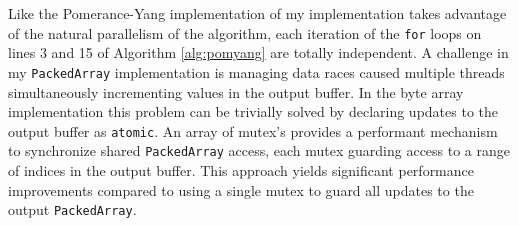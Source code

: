 \documentclass{article}
\theoremstyle{definition}
\begin{document}
Like the Pomerance-Yang implementation of \cite{chum_guy_jacobson_mosunov_2018} my implementation takes advantage of the natural parallelism of the algorithm, each iteration of the \texttt{for} loops on lines 3 and 15 of Algorithm \ref{alg:pomyang} are totally independent. A challenge in my \texttt{PackedArray} implementation is managing data races caused multiple threads simultaneously incrementing values in the output buffer. In the byte array implementation this problem can be trivially solved by declaring updates to the output buffer as \texttt{atomic}. An array of mutex's provides a performant mechanism to synchronize shared \texttt{PackedArray} access, each mutex guarding access to a range of indices in the output buffer. This approach yields significant performance improvements compared to using a single mutex to guard all updates to the output \texttt{PackedArray}.


\pagebreak
\appendix
\end{document}
